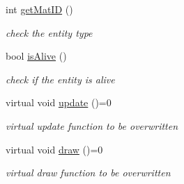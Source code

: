 \begin{DoxyCompactItemize}
int \hyperlink{class_entity_a6e158b373be07455338fd47823354c91}{get\-Mat\-I\-D} ()
\begin{DoxyCompactList}\small\item\em check the entity type \end{DoxyCompactList}\item 
bool \hyperlink{class_entity_ab0986ba7a1b24f022b5623781050c0f1}{is\-Alive} ()
\begin{DoxyCompactList}\small\item\em check if the entity is alive \end{DoxyCompactList}\item 
\hypertarget{class_entity_a59a29d9b7474baf13c9c76859242287d}{virtual void \hyperlink{class_entity_a59a29d9b7474baf13c9c76859242287d}{update} ()=0}\label{class_entity_a59a29d9b7474baf13c9c76859242287d}

\begin{DoxyCompactList}\small\item\em virtual update function to be overwritten \end{DoxyCompactList}\item 
\hypertarget{class_entity_a2e9a2986527958f0b0c43239efe9b270}{virtual void \hyperlink{class_entity_a2e9a2986527958f0b0c43239efe9b270}{draw} ()=0}\label{class_entity_a2e9a2986527958f0b0c43239efe9b270}

\begin{DoxyCompactList}\small\item\em virtual draw function to be overwritten \end{DoxyCompactList}\end{DoxyCompactItemize}
